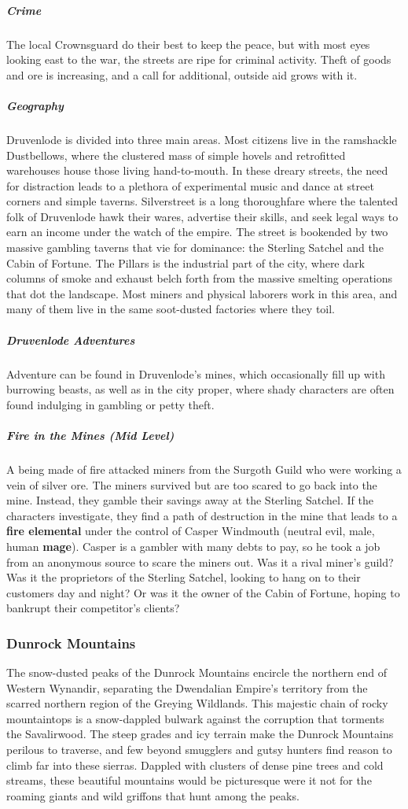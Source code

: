 \documentclass[10pt,a4paper,twoside,bg=print,twocolumn,openany,nodeprecatedcode]{dndbook}
\begin{document}
\subparagraph{Crime}
The local Crownsguard do their best to keep the peace, but with most eyes looking east to the war, the streets are ripe for criminal activity. Theft of goods and ore is increasing, and a call for additional, outside aid grows with it.

\subparagraph{Geography}
Druvenlode is divided into three main areas. Most citizens live in the ramshackle Dustbellows, where the clustered mass of simple hovels and retrofitted warehouses house those living hand-to-mouth. In these dreary streets, the need for distraction leads to a plethora of experimental music and dance at street corners and simple taverns. Silverstreet is a long thoroughfare where the talented folk of Druvenlode hawk their wares, advertise their skills, and seek legal ways to earn an income under the watch of the empire. The street is bookended by two massive gambling taverns that vie for dominance: the Sterling Satchel and the Cabin of Fortune. The Pillars is the industrial part of the city, where dark columns of smoke and exhaust belch forth from the massive smelting operations that dot the landscape. Most miners and physical laborers work in this area, and many of them live in the same soot-dusted factories where they toil.

\subparagraph{Druvenlode Adventures}
Adventure can be found in Druvenlode's mines, which occasionally fill up with burrowing beasts, as well as in the city proper, where shady characters are often found indulging in gambling or petty theft.

\subparagraph{Fire in the Mines (Mid Level)}
A being made of fire attacked miners from the Surgoth Guild who were working a vein of silver ore. The miners survived but are too scared to go back into the mine. Instead, they gamble their savings away at the Sterling Satchel. If the characters investigate, they find a path of destruction in the mine that leads to a \textbf{fire elemental} under the control of Casper Windmouth (neutral evil, male, human \textbf{mage}). Casper is a gambler with many debts to pay, so he took a job from an anonymous source to scare the miners out. Was it a rival miner's guild? Was it the proprietors of the Sterling Satchel, looking to hang on to their customers day and night? Or was it the owner of the Cabin of Fortune, hoping to bankrupt their competitor's clients?

\subsubsection{Dunrock Mountains}
The snow-dusted peaks of the Dunrock Mountains encircle the northern end of Western Wynandir, separating the Dwendalian Empire's territory from the scarred northern region of the Greying Wildlands. This majestic chain of rocky mountaintops is a snow-dappled bulwark against the corruption that torments the Savalirwood. The steep grades and icy terrain make the Dunrock Mountains perilous to traverse, and few beyond smugglers and gutsy hunters find reason to climb far into these sierras. Dappled with clusters of dense pine trees and cold streams, these beautiful mountains would be picturesque were it not for the roaming giants and wild griffons that hunt among the peaks.
\end{document}
